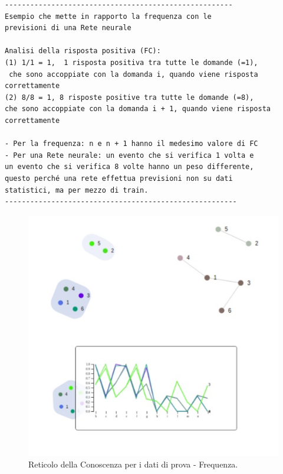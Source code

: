 \begin{verbatim}
------------------------------------------------------
Esempio che mette in rapporto la frequenza con le 
previsioni di una Rete neurale

Analisi della risposta positiva (FC):
(1) 1/1 = 1,  1 risposta positiva tra tutte le domande (=1),
 che sono accoppiate con la domanda i, quando viene risposta
correttamente	
(2) 8/8 = 1, 8 risposte positive tra tutte le domande (=8),
che sono accoppiate con la domanda i + 1, quando viene risposta
correttamente

- Per la frequenza: n e n + 1 hanno il medesimo valore di FC
- Per una Rete neurale: un evento che si verifica 1 volta e
un evento che si verifica 8 volte hanno un peso differente,
questo perché una rete effettua previsioni non su dati
statistici, ma per mezzo di train.
-------------------------------------------------------
\end{verbatim}


\begin{figure}[H]
\centering
	\includegraphics[width=0.50\linewidth]{./image/collage_reticolo-general-FREQ.png}
	\caption{Reticolo della Conoscenza per i dati di prova - Frequenza.}
	\label{Reticolo della Conoscenza per i dati di prova - Frequenza.}
\end{figure}
\noindent



